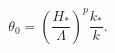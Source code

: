 \begin{equation}\label{eq:theta-t}
  \theta_0=\left(\frac{H_*}{\Lambda}\right)^p
  \frac{k_*}{k}.
\end{equation}

